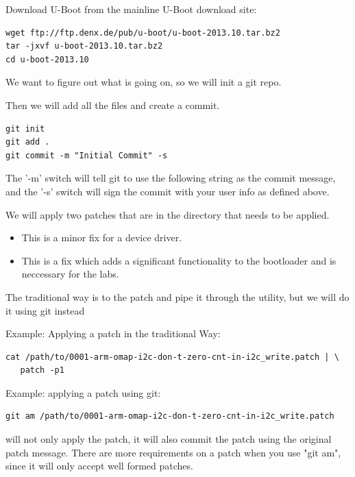 Download U-Boot from the mainline U-Boot download site:

\begin{verbatim}
wget ftp://ftp.denx.de/pub/u-boot/u-boot-2013.10.tar.bz2
tar -jxvf u-boot-2013.10.tar.bz2
cd u-boot-2013.10
\end{verbatim}

We want to figure out what is going on, so we will init a git repo.

Then we will add all the files and create a commit.

\begin{verbatim}
git init
git add .
git commit -m "Initial Commit" -s
\end{verbatim}

The '-m' switch will tell git to use the following string as the commit message,
and the '-s' switch will sign the commit with your user info as defined above.

We will apply two patches that are in the  directory that needs to be applied.

\begin{itemize}
\item {}
	This is a minor fix for a device driver.

\item {}
	This is a fix which adds a significant functionality to the bootloader
	and is neccessary for the labs.

\end{itemize}

The traditional way is to  the patch and pipe it through the  utility,
but we will do it using git instead

Example: Applying a patch in the traditional Way:
{\small
\begin{verbatim}
cat /path/to/0001-arm-omap-i2c-don-t-zero-cnt-in-i2c_write.patch | \
   patch -p1
\end{verbatim}
}

Example: applying a patch using git:

{\small
\begin{verbatim}
git am /path/to/0001-arm-omap-i2c-don-t-zero-cnt-in-i2c_write.patch
\end{verbatim}
}

 will not only apply the patch, it will also commit the patch
using the original patch message. There are more requirements on a patch
when you use "git am", since it will only accept well formed patches.

